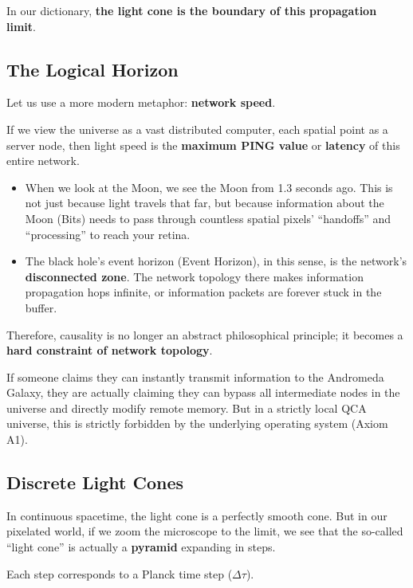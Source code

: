 \documentclass[11pt,a4paper,twoside]{book}
\begin{document}
In our dictionary, \textbf{the light cone is the boundary of this propagation limit}.

\subsection{The Logical Horizon}

Let us use a more modern metaphor: \textbf{network speed}.

If we view the universe as a vast distributed computer, each spatial point as a server node, then light speed is the \textbf{maximum PING value} or \textbf{latency} of this entire network.

\begin{itemize}
\item When we look at the Moon, we see the Moon from 1.3 seconds ago. This is not just because light travels that far, but because information about the Moon (Bits) needs to pass through countless spatial pixels' ``handoffs'' and ``processing'' to reach your retina.

\item The black hole's event horizon (Event Horizon), in this sense, is the network's \textbf{disconnected zone}. The network topology there makes information propagation hops infinite, or information packets are forever stuck in the buffer.
\end{itemize}

Therefore, causality is no longer an abstract philosophical principle; it becomes a \textbf{hard constraint of network topology}.

If someone claims they can instantly transmit information to the Andromeda Galaxy, they are actually claiming they can bypass all intermediate nodes in the universe and directly modify remote memory. But in a strictly local QCA universe, this is strictly forbidden by the underlying operating system (Axiom A1).

\subsection{Discrete Light Cones}

In continuous spacetime, the light cone is a perfectly smooth cone. But in our pixelated world, if we zoom the microscope to the limit, we see that the so-called ``light cone'' is actually a \textbf{pyramid} expanding in steps.

Each step corresponds to a Planck time step ($\Delta\tau$).
\end{document}
